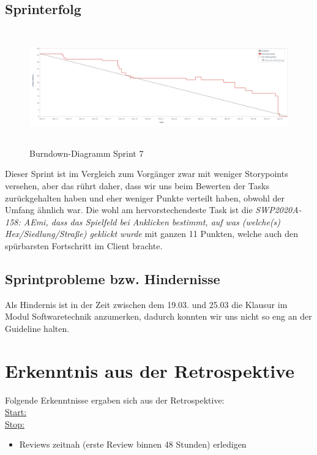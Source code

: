 \documentclass[12pt,a4paper, oneside]{article}
\begin{document}
    \newpage

    \subsection{Sprinterfolg}
    \begin{figure}[h]
        \centering
        \includegraphics[width=\textwidth, height=5cm]{../img/sprint_07/Burndown-Sprint7.png}
        \caption{Burndown-Diagramm Sprint 7}
        \label{fig: Burndown-Sprint7}
    \end{figure}
    \noindent
    Dieser Sprint ist im Vergleich zum Vorgänger zwar mit weniger Storypoints versehen, aber das rührt daher,
    dass wir uns beim Bewerten der Tasks zurückgehalten haben und eher weniger Punkte verteilt haben, obwohl
    der Umfang ähnlich war.
    Die wohl am hervorstechendeste Task ist die \textit{SWP2020A-158: AEmi, dass das Spielfeld bei Anklicken bestimmt, auf was (welche(s) Hex/Siedlung/Straße) geklickt wurde} mit ganzen 11 Punkten, welche auch den spürbarsten Fortschritt
    im Client brachte.

    \subsection{Sprintprobleme bzw. Hindernisse}
    Als Hindernis ist in der Zeit zwischen dem 19.03. und 25.03
    die Klausur im Modul Softwaretechnik anzumerken, dadurch konnten
    wir uns nicht so eng an der Guideline halten.

    \newpage


    \section{Erkenntnis aus der Retrospektive}
    Folgende Erkenntnisse ergaben sich aus der Retrospektive:\\

    \underline{Start:}\\

    \underline{Stop:}
    \begin{itemize}
        \item Reviews zeitnah (erste Review binnen 48 Stunden) erledigen
    \end{itemize}\\
\end{document}
